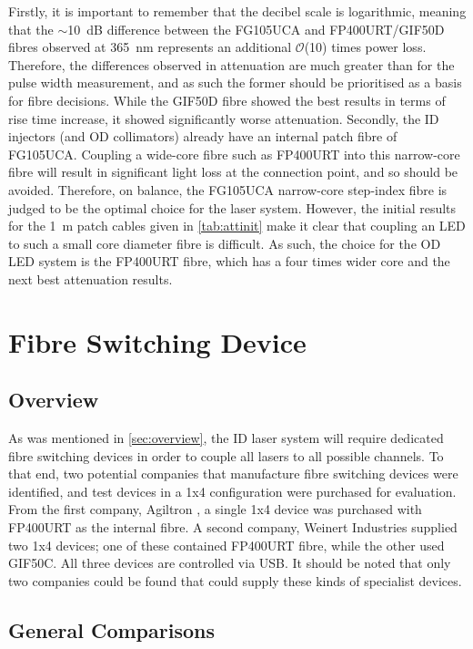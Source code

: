 \documentclass[a4paper,11pt]{article}
\let\oldsim\sim
\renewcommand{\sim}{{\oldsim}}
\begin{document}
Firstly, it is important to remember that the decibel scale is logarithmic, meaning that the $\sim$10~dB difference between the FG105UCA and FP400URT/GIF50D fibres observed at 365~nm represents an additional $\mathcal{O}$(10) times power loss. Therefore, the differences observed in attenuation are much greater than for the pulse width measurement, and as such the former should be prioritised as a basis for fibre decisions. While the GIF50D fibre showed the best results in terms of rise time increase, it showed significantly worse attenuation. Secondly, the ID injectors (and OD collimators) already have an internal patch fibre of FG105UCA. Coupling a wide-core fibre such as FP400URT into this narrow-core fibre will result in significant light loss at the connection point, and so should be avoided. Therefore, on balance, the FG105UCA narrow-core step-index fibre is judged to be the optimal choice for the laser system. However, the initial results for the 1~m patch cables given in \cref{tab:attinit} make it clear that coupling an LED to such a small core diameter fibre is difficult. As such, the choice for the OD LED system is the FP400URT fibre, which has a four times wider core and the next best attenuation results.



\section{Fibre Switching Device}\label{sec:switch}

\subsection{Overview}
As was mentioned in \cref{sec:overview}, the ID laser system will require dedicated fibre switching devices in order to couple all lasers to all possible channels. To that end, two potential companies that manufacture fibre switching devices were identified, and test devices in a 1x4 configuration were purchased for evaluation. From the first company, Agiltron \cite{bib:agiltron}, a single 1x4 device was purchased with FP400URT as the internal fibre. A second company, Weinert Industries \cite{bib:weinert} supplied two 1x4 devices; one of these contained FP400URT fibre, while the other used GIF50C. All three devices are controlled via USB. It should be noted that only two companies could be found that could supply these kinds of specialist devices.

\subsection{General Comparisons}
\end{document}
